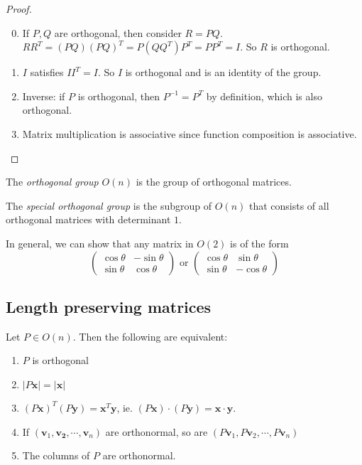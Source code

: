 \documentclass[a4paper]{article}
\begin{document}
\begin{proof}\leavevmode
  \begin{enumerate}[label=\arabic{*}.]
      \setcounter{enumi}{-1}
    \item If $P, Q$ are orthogonal, then consider $R = PQ$. $RR^T = (PQ)(PQ)^T = P(QQ^T)P^T = PP^T = I$. So $R$ is orthogonal.
    \item $I$ satisfies $II^T = I$. So $I$ is orthogonal and is an identity of the group.
    \item Inverse: if $P$ is orthogonal, then $P^{-1}=P^T$ by definition, which is also orthogonal.
    \item Matrix multiplication is associative since function composition is associative.
  \end{enumerate}
\end{proof}

\begin{defi}
  The \emph{orthogonal group} $O(n)$ is the group of orthogonal matrices.
\end{defi}

\begin{defi}
  The \emph{special orthogonal group} is the subgroup of $O(n)$ that consists of all orthogonal matrices with determinant $1$.
\end{defi}

In general, we can show that any matrix in $O(2)$ is of the form
\[
  \begin{pmatrix}
    \cos\theta & -\sin\theta\\
    \sin\theta & \cos\theta
  \end{pmatrix}\text{ or }
  \begin{pmatrix}
    \cos\theta & \sin\theta\\
    \sin\theta & -\cos\theta
  \end{pmatrix}
\]
\subsection{Length preserving matrices}
\begin{thm}
  Let $P\in O(n)$. Then the following are equivalent:
  \begin{enumerate}
    \item $P$ is orthogonal
    \item $|P\mathbf{x}| = |\mathbf{x}|$
    \item $(P\mathbf{x})^T(P\mathbf{y}) = \mathbf{x}^T\mathbf{y}$, ie. $(P\mathbf{x})\cdot(P\mathbf{y}) = \mathbf{x}\cdot \mathbf{y}$.
    \item If $(\mathbf{v}_1, \mathbf{v_2}, \cdots, \mathbf{v}_n)$ are orthonormal, so are $(P\mathbf{v}_1, P\mathbf{v}_2, \cdots, P\mathbf{v}_n)$
    \item The columns of $P$ are orthonormal.
  \end{enumerate}
\end{thm}
\end{document}

